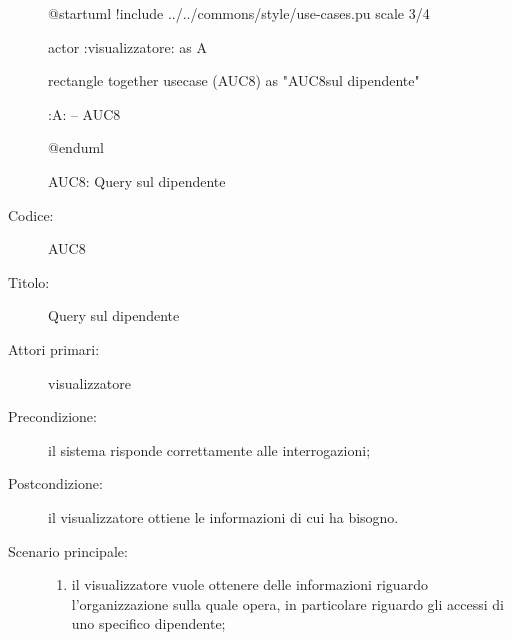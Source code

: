 \documentclass[../../../analisi-dei-requisiti.tex]{subfiles}
\begin{document}
\begin{figure}[h!]
  \centering
  \begin{plantuml}
  @startuml
  !include ../../commons/style/use-cases.pu
  scale 3/4

  actor :visualizzatore: as A

  rectangle {
    together {
      usecase (AUC8) as "AUC8\nQuery sul dipendente"
    }
  }

  :A: -- AUC8

  @enduml
  \end{plantuml}
  \caption{AUC8: Query sul dipendente}
  \label{fig:AUC8}
\end{figure}

\begin{description}
  \item[Codice:] AUC8
  \item[Titolo:] Query sul dipendente
  \item[Attori primari:] visualizzatore
  \item[Precondizione:] il sistema risponde correttamente alle interrogazioni;
  \item[Postcondizione:] il visualizzatore ottiene le informazioni di cui ha bisogno.
  \item[Scenario principale:]
  \begin{enumerate}
    \item il visualizzatore vuole ottenere delle informazioni riguardo l'organizzazione sulla quale opera, in particolare riguardo gli accessi di uno specifico dipendente;
  \end{enumerate}
\end{description}
\end{document}

